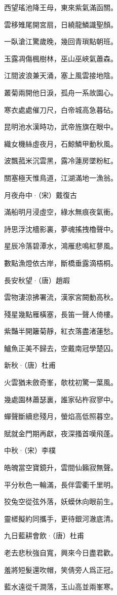 \documentclass[12pt,a4paper]{ctexbook}
\begin{document}
西望瑤池降王母，東來紫氣滿函關。\par
雲移雉尾開宮扇，日繞龍鱗識聖顏。\par
一臥滄江驚歲晚，幾回青瑣點朝班。\par
玉露凋傷楓樹林，巫山巫峽氣蕭森。\par
江間波浪兼天涌，塞上風雲接地陰。\par
叢菊兩開他日淚，孤舟一系故園心。\par
寒衣處處催刀尺，白帝城高急暮砧。\par
昆明池水漢時功，武帝旌旗在眼中。\par
織女機絲虛夜月，石鯨鱗甲動秋風。\par
波飄菰米沉雲黑，露冷蓮房墜粉紅。\par
關塞極天惟鳥道，江湖滿地一漁翁。\par
月夜舟中·（宋）戴復古\par
滿船明月浸虛空，綠水無痕夜氣衝。\par
詩思浮沈檣影裏，夢魂搖拽櫓聲中。\par
星辰冷落碧潭水，鴻雁悲鳴紅蓼風。\par
數點漁燈依古岸，斷橋垂露滴梧桐。\par
長安秋望·（唐）趙嘏\par
雲物淒涼拂署流，漢家宮闕動高秋。\par
殘星幾點雁橫塞，長笛一聲人倚樓。\par
紫豔半開籬菊靜，紅衣落盡渚蓮愁。\par
鱸魚正美不歸去，空戴南冠學楚囚。\par
新秋·（唐）杜甫\par
火雲猶未斂奇峯，欹枕初驚一葉風。\par
幾處園林蕭瑟裏，誰家砧杵寂寥中。\par
蟬聲斷續悲殘月，螢焰高低照暮空。\par
賦就金門期再獻，夜深搔首嘆飛蓬。\par
中秋·（宋）李樸\par
皓魄當空寶鏡升，雲間仙籟寂無聲。\par
平分秋色一輪滿，長伴雲衢千里明。\par
狡兔空從弦外落，妖蟆休向眼前生。\par
靈槎擬約同攜手，更待銀河澈底清。\par
九日藍耕會飲·（唐）杜甫\par
老去悲秋強自寬，興來今日盡君歡。\par
羞將短髮還吹帽，笑倩旁人爲正冠。\par
藍水遠從千澗落，玉山高並兩峯寒。\par
\end{document}
